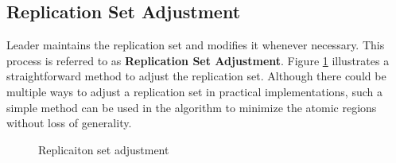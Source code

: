 \subsection{Replication Set Adjustment} \label{subsection:replication-set-adjustment}
Leader maintains the replication set and modifies it whenever necessary. This process is referred to as \textbf{Replication Set Adjustment}. Figure \ref{fig:adjust-replicaitonset} illustrates a straightforward method to adjust the replication set. Although there could be multiple ways to adjust a replication set in practical implementations, such a simple method can be used in the algorithm to minimize the atomic regions without loss of generality.
\begin{figure}
    \begin{framed}
        
    \end{framed}
    \caption{Replicaiton set adjustment}
    \label{fig:adjust-replicaitonset}
\end{figure}

